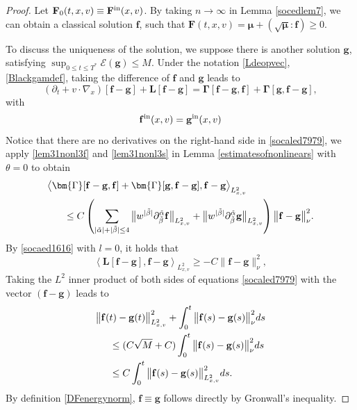 \documentclass[reqno]{amsart}
\numberwithin{equation}{section}
\numberwithin{equation}{section}
\begin{document}
	\begin{proof}
		Let $\mathbf{F}_{0}(t, x, v)\equiv \mathbf{F}^{\rm{in}}(x, v)$. By taking $n \to \infty$ in Lemma \ref{socedlem7}, we can obtain a classical solution $\mathbf{f}$, such that $\mathbf{F}(t, x, v) = \bm{\mu} + (\bm{\sqrt{\mu}} : \mathbf{f}) \geq 0$.
		
		To discuss the uniqueness of the solution, we suppose there is ‌another solution $\mathbf{g}$, satisfying $\sup_{0 \le t \le T^{*}} \mathcal{E}(\mathbf{g}) \le M$. Under the notation \eqref{Ldeopvec}, \eqref{Blackgamdef}, taking the difference of $\mathbf{f}$ and $\mathbf{g}$ leads to
		\begin{equation}\label{socaled7979}
		\left( \partial_{t} + v \cdot \nabla_{x} \right)[\mathbf{f} - \mathbf{g}] + \bm{L}[\mathbf{f} - \mathbf{g}] = \bm{\Gamma}[\mathbf{f} - \mathbf{g}, \mathbf{f}] + \bm{\Gamma}[\mathbf{g}, \mathbf{f} - \mathbf{g}],
		\end{equation}
		with 
		\begin{equation*}
			\mathbf{f}^{\rm{in}}(x, v) = \mathbf{g}^{\rm{in}}(x, v)
		\end{equation*}
		Notice that there are no derivatives on the right-hand side in \eqref{socaled7979}, we apply \eqref{lem31nonl3f} and \eqref{lem31nonl3s} in Lemma \ref{estimatesofnonlinears} with $\theta = 0$ to obtain
		\begin{align*}
		&\big\langle \bm{\Gamma}[\mathbf{f} - \mathbf{g}, \mathbf{f}] + \bm{\Gamma}[\mathbf{g}, \mathbf{f} - \mathbf{g}], \mathbf{f} - \mathbf{g} \big\rangle_{L^{2}_{x,v}} \\
		&\hspace{0.6cm}\leq C \left( \sum_{|\tilde{\alpha}| + |\tilde{\beta}| \leq 4} \big\| w^{| \tilde{\beta} |} \partial_{\tilde{\beta}}^{\tilde{\alpha}} \mathbf{f}\big\|_{L^{2}_{x,v}} + \big\| w^{| \tilde{\beta} |} \partial_{\tilde{\beta}}^{\tilde{\alpha}} \mathbf{g}\big\|_{L^{2}_{x,v}} \right) \big\|\mathbf{f} - \mathbf{g}\big\|_{\nu}^{2}.
		\end{align*}
		By \eqref{socaed1616} with $l = 0$, it holds that
		\[
		\left\langle \mathbf{L}[\mathbf{f} - \mathbf{g}], \mathbf{f} - \mathbf{g} \right\rangle_{L^{2}_{x,v}} \ge -C \|\mathbf{f} - \mathbf{g}\|_{\nu}^{2},
		\]
		Taking the $L^2$ inner product of both sides of equations \eqref{socaled7979} with the vector $(\mathbf{f} - \mathbf{g})$ leads to
		\begin{align*}
		&\big\|\mathbf{f}(t) - \mathbf{g}(t)\big\|_{L^{2}_{x,v}}^{2} + \int_{0}^{t} \big\|\mathbf{f}(s) - \mathbf{g}(s)\big\|_{\nu}^{2} ds \\
		&\hspace{0.5cm}\leq (C\sqrt{M} + C) \int_{0}^{t} \big\|\mathbf{f}(s) - \mathbf{g}(s)\big\|_{\nu}^{2} ds \\
		&\hspace{0.5cm}\leq C \int_{0}^{t} \big\|\mathbf{f}(s) - \mathbf{g}(s)\big\|_{L^{2}_{x,v}}^{2} ds.
		\end{align*}
	By definition \eqref{DFenergynorm}, $\mathbf{f} \equiv \mathbf{g}$ follows directly by Gronwall's inequality.
		

\end{proof}
\end{document}
